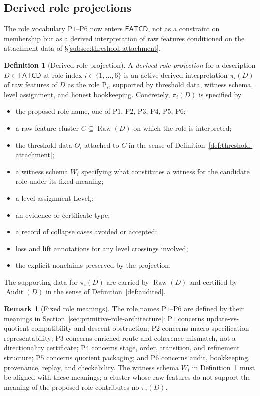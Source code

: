 \documentclass[11pt]{article}
\theoremstyle{definition}
\newtheorem{definition}[theorem]{Definition}
\newtheorem{remark}[theorem]{Remark}
\newcommand{\FATCD}{\ensuremath{\mathsf{FATCD}}}
\newcommand{\Raw}[1]{\ensuremath{\operatorname{Raw}\!\left(#1\right)}}
\newcommand{\Audit}[1]{\ensuremath{\operatorname{Audit}\!\left(#1\right)}}
\newcommand{\Pone}{\ensuremath{\mathrm{P1}}}
\newcommand{\Ptwo}{\ensuremath{\mathrm{P2}}}
\newcommand{\Pthree}{\ensuremath{\mathrm{P3}}}
\newcommand{\Pfour}{\ensuremath{\mathrm{P4}}}
\newcommand{\Pfive}{\ensuremath{\mathrm{P5}}}
\newcommand{\Psix}{\ensuremath{\mathrm{P6}}}
\begin{document}
\subsection{Derived role projections}\label{subsec:derived-role-projections}

The role vocabulary \Pone{}--\Psix{} now enters \FATCD{}, not as a
constraint on membership but as a derived interpretation of raw
features conditioned on the attachment data of
\S\ref{subsec:threshold-attachment}.

\begin{definition}[Derived role projection]\label{def:role-projection}
A \emph{derived role projection} for a description \(D \in \FATCD{}\) at
role index \(i \in \{1,\ldots,6\}\) is an active derived interpretation
\(\pi_i(D)\) of raw features of \(D\) as the role \(\mathrm{P}_i\), supported
by threshold data, witness schema, level assignment, and honest bookkeeping.
Concretely, \(\pi_i(D)\) is specified by
\begin{itemize}[topsep=2pt,itemsep=1pt]
  \item the proposed role name, one of \Pone{}, \Ptwo{}, \Pthree{},
    \Pfour{}, \Pfive{}, \Psix{};
  \item a raw feature cluster \(C \subseteq \Raw{D}\) on which the role is
    interpreted;
  \item the threshold data \(\Theta_i\) attached to \(C\) in the sense of
    Definition~\ref{def:threshold-attachment};
  \item a witness schema \(W_i\) specifying what constitutes a witness for
    the candidate role under its fixed meaning;
  \item a level assignment \(\mathrm{Level}_i\);
  \item an evidence or certificate type;
  \item a record of collapse cases avoided or accepted;
  \item loss and lift annotations for any level crossings involved;
  \item the explicit nonclaims preserved by the projection.
\end{itemize}
The supporting data for \(\pi_i(D)\) are carried by \(\Raw{D}\) and certified
by \(\Audit{D}\) in the sense of Definition~\ref{def:audited}.
\end{definition}

\begin{remark}[Fixed role meanings]\label{rem:fixed-role-meanings}
The role names \Pone{}--\Psix{} are defined by their meanings in
Section~\ref{sec:primitive-role-architecture}: \Pone{} concerns
update-vs-quotient compatibility and descent obstruction; \Ptwo{} concerns
macro-specification representability; \Pthree{} concerns enriched
route and coherence mismatch, not a directionality certificate; \Pfour{}
concerns stage, order, transition, and refinement structure; \Pfive{}
concerns quotient packaging; and
\Psix{} concerns audit, bookkeeping, provenance, replay, and checkability.
The witness schema \(W_i\) in Definition~\ref{def:role-projection} must be
aligned with these meanings; a cluster whose raw features do not support the
meaning of the proposed role contributes no \(\pi_i(D)\).
\end{remark}
\end{document}
